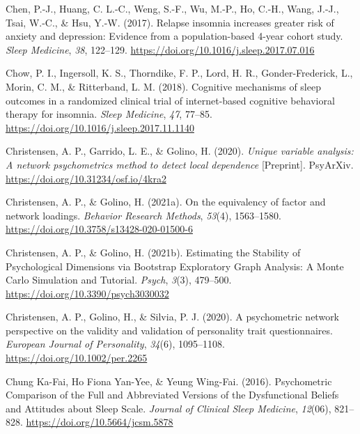 \documentclass[
  ,doc,11pt, twoside,floatsintext]{apa6}
\newlength{\cslhangindent}
\newlength{\cslentryspacingunit} %
\newenvironment{CSLReferences}[2] %
 {%
  \setlength{\parindent}{0pt}
  \ifodd #1
  \let\oldpar\par
  \def\par{\hangindent=\cslhangindent\oldpar}
  \fi
  \setlength{\parskip}{#2\cslentryspacingunit}
 }%
 {}
\begin{document}
\begin{CSLReferences}{1}{0}
\leavevmode{}%
Chen, P.-J., Huang, C. L.-C., Weng, S.-F., Wu, M.-P., Ho, C.-H., Wang, J.-J., Tsai, W.-C., \& Hsu, Y.-W. (2017). Relapse insomnia increases greater risk of anxiety and depression: Evidence from a population-based 4-year cohort study. \emph{Sleep Medicine}, \emph{38}, 122--129. \url{https://doi.org/10.1016/j.sleep.2017.07.016}

\leavevmode{}%
Chow, P. I., Ingersoll, K. S., Thorndike, F. P., Lord, H. R., Gonder-Frederick, L., Morin, C. M., \& Ritterband, L. M. (2018). Cognitive mechanisms of sleep outcomes in a randomized clinical trial of internet-based cognitive behavioral therapy for insomnia. \emph{Sleep Medicine}, \emph{47}, 77--85. \url{https://doi.org/10.1016/j.sleep.2017.11.1140}

\leavevmode{}%
Christensen, A. P., Garrido, L. E., \& Golino, H. (2020). \emph{Unique variable analysis: {A} network psychometrics method to detect local dependence} {[}Preprint{]}. {PsyArXiv}. \url{https://doi.org/10.31234/osf.io/4kra2}

\leavevmode{}%
Christensen, A. P., \& Golino, H. (2021a). On the equivalency of factor and network loadings. \emph{Behavior Research Methods}, \emph{53}(4), 1563--1580. \url{https://doi.org/10.3758/s13428-020-01500-6}

\leavevmode{}%
Christensen, A. P., \& Golino, H. (2021b). Estimating the {Stability} of {Psychological Dimensions} via {Bootstrap Exploratory Graph Analysis}: {A Monte Carlo Simulation} and {Tutorial}. \emph{Psych}, \emph{3}(3), 479--500. \url{https://doi.org/10.3390/psych3030032}

\leavevmode{}%
Christensen, A. P., Golino, H., \& Silvia, P. J. (2020). A psychometric network perspective on the validity and validation of personality trait questionnaires. \emph{European Journal of Personality}, \emph{34}(6), 1095--1108. \url{https://doi.org/10.1002/per.2265}

\leavevmode{}%
Chung Ka-Fai, Ho Fiona Yan-Yee, \& Yeung Wing-Fai. (2016). Psychometric {Comparison} of the {Full} and {Abbreviated Versions} of the {Dysfunctional Beliefs} and {Attitudes} about {Sleep Scale}. \emph{Journal of Clinical Sleep Medicine}, \emph{12}(06), 821--828. \url{https://doi.org/10.5664/jcsm.5878}


\end{CSLReferences}
\end{document}
